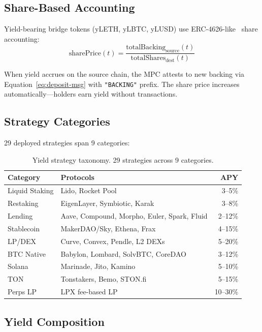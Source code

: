 \documentclass[11pt]{article}
\begin{document}
\subsection{Share-Based Accounting}

Yield-bearing bridge tokens (yLETH, yLBTC, yLUSD) use ERC-4626-like~\cite{erc4626} share accounting:
\begin{equation}
  \text{sharePrice}(t) = \frac{\text{totalBacking}_{\text{source}}(t)}{\text{totalShares}_{\text{dest}}(t)}
\end{equation}

When yield accrues on the source chain, the MPC attests to new backing via Equation~\eqref{eq:deposit-msg} with \texttt{"BACKING"} prefix. The share price increases automatically---holders earn yield without transactions.

\subsection{Strategy Categories}

29 deployed strategies span 9 categories:

\begin{table}[h]
\centering
\scriptsize
\begin{tabular}{llr}
\toprule
\textbf{Category} & \textbf{Protocols} & \textbf{APY} \\
\midrule
Liquid Staking & Lido, Rocket Pool & 3--5\% \\
Restaking & EigenLayer, Symbiotic, Karak & 3--8\% \\
Lending & Aave, Compound, Morpho, Euler, Spark, Fluid & 2--12\% \\
Stablecoin & MakerDAO/Sky, Ethena, Frax & 4--15\% \\
LP/DEX & Curve, Convex, Pendle, L2 DEXs & 5--20\% \\
BTC Native & Babylon, Lombard, SolvBTC, CoreDAO & 3--12\% \\
Solana & Marinade, Jito, Kamino & 5--10\% \\
TON & Tonstakers, Bemo, STON.fi & 5--15\% \\
Perps LP & LPX fee-based LP & 10--30\% \\
\bottomrule
\end{tabular}
\caption{Yield strategy taxonomy. 29 strategies across 9 categories.}
\label{tab:strategies}
\end{table}

\subsection{Yield Composition}
\end{document}
